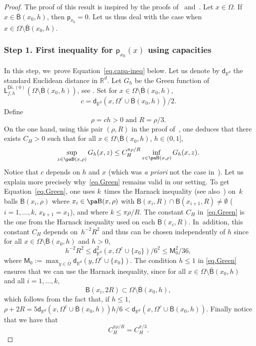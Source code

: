 \begin{proof}
The proof of this result is inspired by the proofs of~\cite[Lem.\,4.6]{BEGK} and~\cite[Prop.\,7.9]{landim2017dirichlet}. Let $x\in \Omega$. If~$x\in \overline{\mathsf B}(x_0,h)$, then $\mathsf p_{x_0}=0$. Let us thus deal with the case when $x\in \Omega\setminus \overline{\mathsf B}(x_0,h)$.

\subsubsection*{Step 1. First inequality for $ \mathsf p_{x_0}(x)$ using capacities}

In this step, we~prove Equation~\eqref{eq.capa-ineq} below. Let us denote by $\mathsf d_{\mathbb R^d}$ the standard Euclidean distance in $\mathbb R^d$. Let $G_h$ be the Green function of $ \mathsf L^{\mathsf{Di},(0)}_{f,h}(\Omega\setminus \overline{\mathsf B}(x_0,h))$, see \cite[Eq.\,(2.3)]{BEGK}.
Set for $x\in \Omega\setminus \overline{\mathsf B}(x_0,h)$,
\begin{equation}\label{eq.cc}
c=\mathsf d_{\mathbb R^d}(x, \Omega^c\cup \overline{\mathsf B}(x_0,h))/2.
\end{equation}
Define
\[
\text{$\rho=ch>0$ and $R=\rho/3$}.
\]
On the one hand, using this pair $(\rho,R)$ in the proof of~\cite[Lem.\,4.6]{BEGK}, one deduces that there exists $C_H>0$ such that for all $x\in\Omega\setminus \overline{\mathsf B}(x_0,h) $, $h\in (0,1]$,
\begin{equation}\label{eq.Green}
\sup_{z\in \pa \mathsf B(x,\rho)}G_h(x,z) \le C_H^{\pi \rho/R}\inf_{z\in \pa \mathsf B(x,\rho)}G_h (x,z).
\end{equation}
Notice that $c$ depends on $h$ and $x$ (which was \textit{a priori} not the case in~\cite[Lem.\,4.6]{BEGK}). Let us explain more precisely why~\eqref{eq.Green} remains valid in our setting. To get Equation~\eqref{eq.Green}, one uses $k$~times the Harnack inequality \cite{MR1814364} (see also~\cite[Lem.\,4.1]{BEGK}) on~$k$ balls $\mathsf B(x_i,\rho)$ where $x_i\in \pa\mathsf B(x,\rho)$ with $\mathsf B(x_i,R)\cap \mathsf B(x_{i+1},R)\neq \emptyset$ ($i=1,\ldots,k$, $x_{k+1}=x_1$), and where $k\le \pi \rho/R$. The constant $C_H$ in~\eqref{eq.Green} is the one from the Harnack inequality used on each $\mathsf B(x_i,R)$. In~addition, this constant $C_H$ depends on~$h^{-2} R^2$ and thus can be chosen independently of $h$ since for all $x\in\Omega\setminus \overline{\mathsf B}(x_0,h)$ and $h>0$,
\[
h^{-2} R^2 \le \mathsf d_{\mathbb R^d}^2(x, \Omega^c\cup \{x_0\})/6^2 \le \mathsf M_0^2/36,
\]
where $\mathsf M_0:=\max_{y\in \overline{\Omega} }\mathsf d_{\mathbb R^d}(y, \Omega^c\cup \{x_0\})$.
The condition $h\le 1$ in \eqref{eq.Green} ensures that we can use the Harnack inequality, since for all $x\in \Omega\setminus \overline{\mathsf B}(x_0,h)$ and all $i=1,\ldots,k$,
\[
{\mathsf B(x_i,2R)} \subset \Omega\setminus \overline{\mathsf B}(x_0,h),
\]
which follows from the fact that, if $h\le 1$, $\rho +2R=5\mathsf d_{\mathbb R^d}(x, \Omega^c\cup \overline{\mathsf B}(x_0,h))h/6<\mathsf d_{\mathbb R^d}(x, \Omega^c\cup \overline{\mathsf B}(x_0,h))$.
Finally notice that we have that
\[
C_H^{\pi \rho/R}=C_H^{\pi /3}.
\]


\end{proof}
